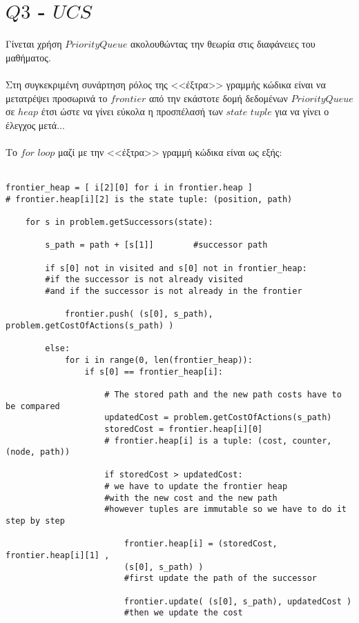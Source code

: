 \documentclass[12pt]{article}
\begin{document}
\section*{$Q3$ - $UCS$}
Γίνεται χρήση $PriorityQueue$ ακολουθώντας την θεωρία στις διαφάνειες του μαθήματος.\\\\
Στη συγκεκριμένη συνάρτηση ρόλος της <<έξτρα>> γραμμής κώδικα είναι να μετατρέψει προσωρινά το $frontier$ από την εκάστοτε δομή δεδομένων $PriorityQueue$ σε $heap$ έτσι ώστε να γίνει εύκολα η προσπέλασή των $state$ $tuple$ για να γίνει ο έλεγχος μετά...\\\\
Το $for$ $loop$ μαζί με την <<έξτρα>> γραμμή κώδικα είναι ως εξής:\\\\
\begin{otherlanguage}{english}
\begin{verbatim}
frontier_heap = [ i[2][0] for i in frontier.heap ]     
# frontier.heap[i][2] is the state tuple: (position, path)
    
    for s in problem.getSuccessors(state):
        
        s_path = path + [s[1]]        #successor path
        
        if s[0] not in visited and s[0] not in frontier_heap:   
        #if the successor is not already visited
        #and if the successor is not already in the frontier
        
            frontier.push( (s[0], s_path), problem.getCostOfActions(s_path) )
        
        else:
            for i in range(0, len(frontier_heap)):
                if s[0] == frontier_heap[i]:
                    
                    # The stored path and the new path costs have to be compared
                    updatedCost = problem.getCostOfActions(s_path)
                    storedCost = frontier.heap[i][0]    
                    # frontier.heap[i] is a tuple: (cost, counter, (node, path))
                    
                    if storedCost > updatedCost:    
                    # we have to update the frontier heap 
                    #with the new cost and the new path
                    #however tuples are immutable so we have to do it step by step
                        
                        frontier.heap[i] = (storedCost, frontier.heap[i][1] , 
                        (s[0], s_path) )  
                        #first update the path of the successor
            
                        frontier.update( (s[0], s_path), updatedCost )   
                        #then we update the cost
\end{verbatim}
\end{otherlanguage}
\end{document}
